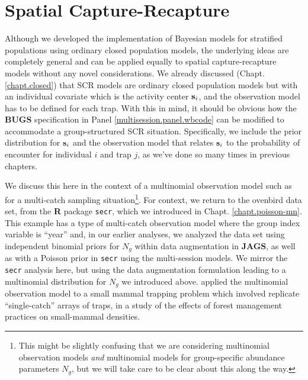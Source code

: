 \section{Spatial Capture-Recapture}

Although we developed the implementation of Bayesian models for
stratified populations using ordinary closed population models, the
underlying ideas are completely general and can be applied equally to
spatial capture-recapture models without any novel considerations.
We already discussed (Chapt. \ref{chapt.closed})
that SCR models are ordinary closed population models
but with an individual covariate which is the
activity center ${\bf s}_{i}$, and the observation model has to be
defined for each trap. With this in mind, it should be obvious how the
{\bf BUGS} specification in Panel \ref{multisession.panel.wbcode} can be modified
to accommodate a group-structured SCR situation.
Specifically, we include the prior distribution for ${\bf s}_{i}$ and
the observation model that relates ${\bf s}_{i}$ to the probability of
encounter for individual $i$ and trap $j$, as we've done so many times
in previous chapters.

We discuss this here in the context of a multinomial observation model
such as for a multi-catch sampling situation\footnote{This might be
  slightly confusing that we are considering multinomial observation
  models {\it and} multinomial models for group-specific abundance
  parameters $N_{g}$, but we will take care to be clear about this
  along the way.}.
For context, we return to the
ovenbird data set, from the {\bf R} package \mbox{\tt secr}, which we
introduced in Chapt. \ref{chapt.poisson-mn}. This example has a type
of multi-catch observation model where the group index variable is
``year'' and, in our earlier analyses, we analyzed the data set using
independent binomial priors for $N_{g}$ within data augmentation in
{\bf JAGS}, as well as with a Poisson prior in \mbox{\tt secr} using
the multi-session models.  We mirror the \mbox{\tt secr} analysis
here, but using the data augmentation formulation leading to a
multinomial distribution for $N_{g}$ we introduced above.
\citet{royle_converse:2013} applied the multinomial observation model to a small mammal
trapping problem which involved replicate ``single-catch'' arrays of
traps, in a study of the effects of forest management practices on
small-mammal densities.

